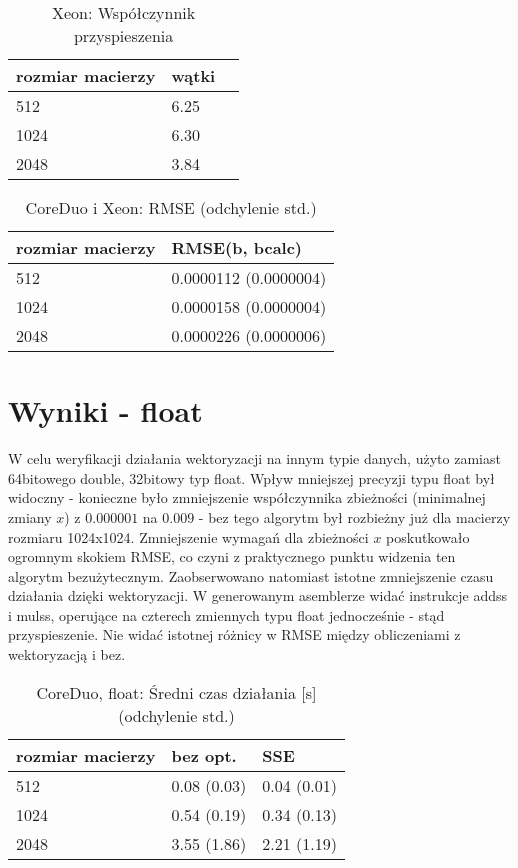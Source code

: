 \documentclass[11pt,a4paper]{article}
\begin{document}
\begin{table}[h!]
\begin{center}
\begin{tabular}{lll}
\toprule
rozmiar macierzy &  wątki \\
\midrule
512 & 6.25 \\
1024 & 6.30 \\
2048 & 3.84 \\
\bottomrule
\end{tabular}
\caption{Xeon: Współczynnik przyspieszenia}
\end{center}
\end{table}

\begin{table}[h!]
\begin{center}
\begin{tabular}{ll}
\toprule
rozmiar macierzy & RMSE(b, bcalc) \\
\midrule
512  & 0.0000112 (0.0000004)  \\
1024 & 0.0000158 (0.0000004)  \\
2048 & 0.0000226 (0.0000006)  \\
\bottomrule
\end{tabular}
\caption{CoreDuo i Xeon: RMSE (odchylenie std.)}
\end{center}
\end{table}

\section{Wyniki - float}
W celu weryfikacji działania wektoryzacji na innym typie danych, użyto zamiast 64bitowego double, 32bitowy typ float. Wpływ mniejszej precyzji typu float był widoczny - konieczne było zmniejszenie współczynnika zbieżności (minimalnej zmiany $x$) z $0.000001$ na $0.009$ - bez tego algorytm był rozbieżny już dla macierzy rozmiaru 1024x1024. Zmniejszenie wymagań dla zbieżności $x$ poskutkowało ogromnym skokiem RMSE, co czyni z praktycznego punktu widzenia ten algorytm bezużytecznym. Zaobserwowano natomiast istotne zmniejszenie czasu działania dzięki wektoryzacji. W generowanym asemblerze widać instrukcje addss i mulss, operujące na czterech zmiennych typu float jednocześnie - stąd przyspieszenie. Nie widać istotnej różnicy w RMSE między obliczeniami z wektoryzacją i bez.

\begin{table}[h!]
\begin{center}
\begin{tabular}{lll}
\toprule
rozmiar macierzy & bez opt. &  SSE \\
\midrule
512  & 0.08 (0.03) & 0.04 (0.01) \\
1024 & 0.54 (0.19) & 0.34 (0.13) \\
2048 & 3.55 (1.86) & 2.21 (1.19) \\
\bottomrule
\end{tabular}
\caption{CoreDuo, float: Średni czas działania [s] (odchylenie std.)}
\end{center}
\end{table}
\end{document}
